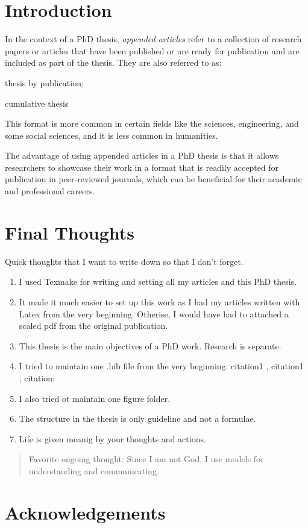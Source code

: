 \section{Introduction}
In the context of a PhD thesis, \textit{appended articles} refer to a collection of research papers or articles that have been published or are ready for publication and are included as part of the thesis. 
They are also referred to as:
\begin{inparaenum}
\item thesis by publication;
\item cumulative thesis
\end{inparaenum}
This format is more common in certain fields like the sciences, engineering, and some social sciences, and it is less common in humanities.

The advantage of using appended articles in a PhD thesis is that it allows researchers to showcase their work in a format that is readily accepted for publication in peer-reviewed journals, which can be beneficial for their academic and professional careers. 

\section{Final Thoughts}

Quick thoughts that I want to write down so that I don't forget.

\begin{enumerate}
\item I used Texmake for writing and setting all my articles and this PhD thesis.
\item It made it much easier to set up this work as I had my articles written with Latex from the very beginning. Otherise, I would have had to attached a scaled pdf from the original publication.
\item This thesis is the main objectives of a PhD work. Research is separate.
\item I tried to maintain one .bib file from the very beginning. citation1 \cite{ref1}, citation1 \cite{ref3}, citation:  \cite{ref2}
\item I also tried ot maintain one figure folder.
\item The structure in the thesis is only guideline and not a formulae.
\item Life is given meanig by your thoughts and actions. 

\end{enumerate}
\begin{quote}
\begin{center}
Favorite ongoing thought: Since I am not God, I use models for understanding and communicating.

\end{center}

\end{quote}
\section*{Acknowledgements}
 